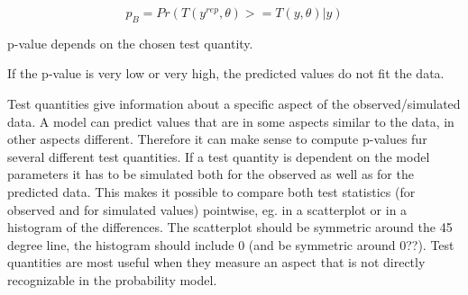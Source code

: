 \documentclass{article}
\begin{document}
\begin{equation}
p_B = Pr(T(y^{rep},\theta) >= T(y,\theta) | y)
\label{eq:bayesian_p}
\end{equation}

p-value depends on the chosen test quantity.

If the p-value is very low or very high, the predicted values do not fit the data.


Test quantities give information about a specific aspect of the observed/simulated data. A model can predict values that are in some aspects similar to the data, in other aspects different. Therefore it can make sense to compute p-values fur several different test quantities.
If a test quantity is dependent on the model parameters it has to be simulated both for the observed as well as for the predicted data. This makes it possible to compare both test statistics (for observed and for simulated values) pointwise, eg. in a scatterplot or in a histogram of the differences. The scatterplot should be symmetric around the 45 degree line, the histogram should include 0 (and be symmetric around 0??).
Test quantities are most useful when they measure an aspect that is not directly recognizable in the probability model.
\end{document}
